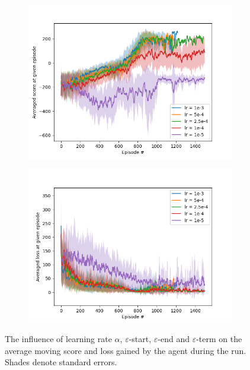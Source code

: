 \documentclass{article}
\begin{document}
\begin{figure}[H]
\begin{subfigure}{0.5\linewidth}
    \end{subfigure}
    \quad
    \begin{subfigure}{0.5\linewidth}
        \centering
        \includegraphics[width=\linewidth]{figs/LR.png}
    \end{subfigure}
    \begin{subfigure}{0.5\linewidth}
        \centering
        \includegraphics[width=\linewidth]{figs/LR(loss).png}
    \end{subfigure}
    \caption{The influence of learning rate $\alpha$, $\varepsilon$-start, $\varepsilon$-end and $\varepsilon$-term on the average moving score and loss gained by the agent during the run. Shades denote standard errors.}
    \label{fig:results}
\end{figure}
\end{document}
